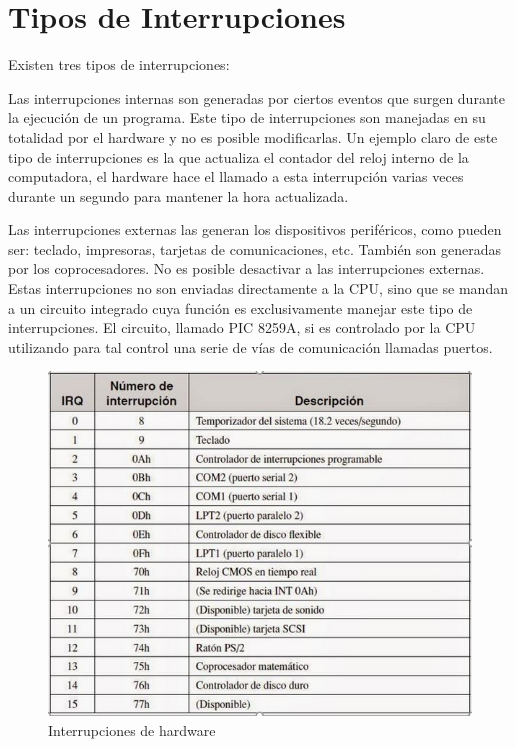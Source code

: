 \documentclass{article}
\begin{document}
\section{Tipos de Interrupciones}
Existen tres tipos de interrupciones:
Las interrupciones internas son generadas por ciertos eventos que surgen durante la ejecución de un programa.
Este tipo de interrupciones son manejadas en su totalidad por el hardware y no es posible modificarlas.
Un ejemplo claro de este tipo de interrupciones es la que actualiza el contador del reloj interno de la computadora, el hardware hace el llamado a esta interrupción varias veces durante un segundo para mantener la hora actualizada.
Las interrupciones externas las generan los dispositivos periféricos, como pueden ser: teclado, impresoras, tarjetas de comunicaciones, etc. También son generadas por los coprocesadores.
No es posible desactivar a las interrupciones externas.
Estas interrupciones no son enviadas directamente a la CPU, sino que se mandan a un circuito integrado cuya función es exclusivamente manejar este tipo de interrupciones. El circuito, llamado PIC 8259A, si es controlado por la CPU utilizando para tal control una serie de vías de comunicación llamadas puertos.

\begin{figure}[h]
\centering
\includegraphics[scale=0.7]{interrupciones}
\caption{Interrupciones de hardware}
\label{fig:interrupciones}
\end{figure}
\end{document}
